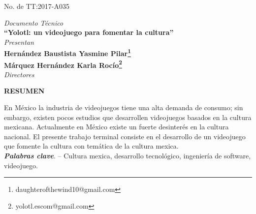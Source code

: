 	\begin{center}
	    
	    
\begin{multicols}{2} 
\raggedright{{\fontsize{14}{20} No. de TT:2017-A035}} 

\end{multicols}\vspace{1cm}

	    {\fontsize{14}{20} \textit{Documento Técnico}}\vspace{1cm}\\
	    {\fontsize{16}{20} \textbf{``Yolotl: un videojuego para fomentar la cultura''}}\vspace{1.5cm}\\
	    {\fontsize{14}{20} \textit{Presentan}}\\
	    {\fontsize{14}{20} \textbf{Hernández Baustista Yasmine Pilar\footnote{daughterofthewind10@gmail.com}}}\vspace{1cm}\\
	    {\fontsize{14}{20} \textbf{Márquez Hernández Karla Rocío\footnote{yolotl.escom@gmail.com}}}\vspace{1cm}\\
	   
	   \fontsize{14}{20} \textit{Directores}\vspace{1.5cm}\\
	    
	    
{\fboxrule=0pt \fboxsep=12pt	    
}
\end{center}
\begin{center}
{\fontsize{14}{20} \textbf{RESUMEN}}
\end{center}
En México la industria de videojuegos tiene una alta demanda de consumo; sin embargo, existen pocos estudios que desarrollen videojuegos basados en la cultura mexicana. Actualmente en México existe un fuerte desinterés en la cultura nacional. El presente trabajo terminal consiste en el desarrollo de un videojuego que fomente la cultura con temática de la cultura mexica. 
\\
 
\textbf{\textit{Palabras clave}}. –  Cultura mexica, desarrollo tecnológico, ingeniería de software, videojuego.
